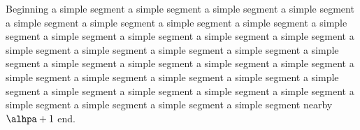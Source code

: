 \documentclass{article}
\begin{document}
Beginning a simple segment a simple segment a simple segment a simple segment a simple segment a simple segment a simple segment a simple segment a simple segment a simple segment a simple segment a simple segment a simple segment a simple segment a simple segment a simple segment a simple segment a simple segment a simple segment a simple segment a simple segment a simple segment a simple segment a simple segment a simple segment a simple segment a simple segment a simple segment a simple segment a simple segment a simple segment a simple segment a simple segment a simple segment a simple segment nearby $\alhpa+1$ end.
\end{document}
